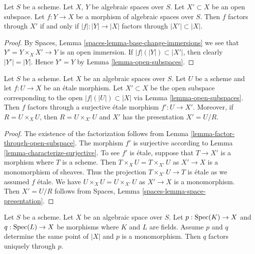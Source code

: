 \begin{lemma}
\label{lemma-factor-through-open-subspace}
Let $S$ be a scheme.
Let $X$, $Y$ be algebraic spaces over $S$.
Let $X' \subset X$ be an open subspace.
Let $f : Y \to X$ be a morphism of algebraic spaces over $S$.
Then $f$ factors through $X'$ if and only if $|f| : |Y| \to |X|$
factors through $|X'| \subset |X|$.
\end{lemma}

\begin{proof}
By Spaces, Lemma \ref{spaces-lemma-base-change-immersions}
we see that $Y' = Y \times_X X' \to Y$ is an open immersion.
If $|f|(|Y|) \subset |X'|$, then clearly $|Y'| = |Y|$. Hence $Y' = Y$ by
Lemma \ref{lemma-open-subspaces}.
\end{proof}

\begin{lemma}
\label{lemma-etale-image-open}
Let $S$ be a scheme. Let $X$ be an algebraic spaces over $S$.
Let $U$ be a scheme and let $f : U \to X$ be an \'etale morphism.
Let $X' \subset X$ be the open subspace corresponding to
the open $|f|(|U|) \subset |X|$ via
Lemma \ref{lemma-open-subspaces}.
Then $f$ factors through a surjective \'etale morphism $f' : U \to X'$.
Moreover, if $R = U \times_X U$, then $R = U \times_{X'} U$ and $X'$ has
the presentation $X' = U/R$.
\end{lemma}

\begin{proof}
The existence of the factorization follows from
Lemma \ref{lemma-factor-through-open-subspace}.
The morphism $f'$ is surjective according to
Lemma \ref{lemma-characterize-surjective}.
To see $f'$ is \'etale, suppose that $T \to X'$ is a morphism
where $T$ is a scheme. Then $T \times_X U = T \times_{X'} U$
as $X' \to X$ is a monomorphism of sheaves. Thus the projection
$T \times_{X'} U \to T$ is \'etale as we assumed $f$ \'etale.
We have $U \times_X U = U \times_{X'} U$ as $X' \to X$ is a monomorphism.
Then $X' = U/R$ follows from
Spaces, Lemma \ref{spaces-lemma-space-presentation}.
\end{proof}

\begin{lemma}
\label{lemma-equivalence-class-point-monomorphism}
Let $S$ be a scheme. Let $X$ be an algebraic space over $S$.
Let $p : \mathop{\mathrm{Spec}}(K) \to X$ and $q : \mathop{\mathrm{Spec}}(L) \to X$
be morphisms where $K$ and $L$ are fields. Assume $p$ and $q$
determine the same point of $|X|$ and $p$ is a monomorphism.
Then $q$ factors uniquely through $p$.
\end{lemma}

